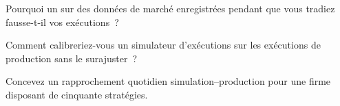 \begin{interviewq}\label{iq:rs:simulation-versus-live:4}
Pourquoi un  sur des données de marché enregistrées pendant que vous tradiez fausse-t-il vos exécutions~?
\end{interviewq}

\begin{interviewq}\label{iq:rs:simulation-versus-live:5}
Comment calibreriez-vous un simulateur d'exécutions sur les exécutions de production sans le surajuster~?
\end{interviewq}

\begin{interviewq}\label{iq:rs:simulation-versus-live:6}
Concevez un rapprochement quotidien simulation--production pour une firme disposant de cinquante stratégies.
\end{interviewq}
